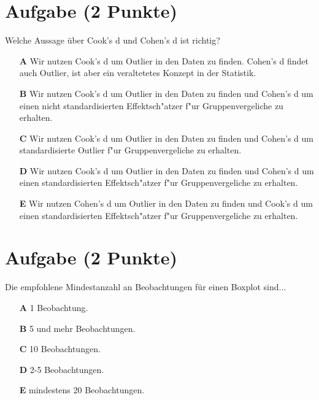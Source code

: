\documentclass[a4paper, 10pt]{scrartcl}\usepackage[]{graphicx}\usepackage[]{xcolor}
\begin{document}
\section{Aufgabe \hfill (2 Punkte)}

Welche Aussage {\"u}ber Cook's d und Cohen's d ist richtig? 



\begin{enumerate}
\item [\textbf{A} \msquare] Wir nutzen Cook's d um Outlier in den Daten zu finden. Cohen's d findet auch Outlier, ist aber ein veraltetetes Konzept in der Statistik.
\item [\textbf{B} \msquare] Wir nutzen Cook's d um Outlier in den Daten zu finden und Cohen's d um einen nicht standardisierten Effektsch{"a}tzer f{"u}r Gruppenvergeliche zu erhalten.
\item [\textbf{C} \msquare] Wir nutzen Cook's d um Outlier in den Daten zu finden und Cohen's d um standardisierte Outlier f{"u}r Gruppenvergeliche zu erhalten.
\item [\textbf{D} \msquare] Wir nutzen Cook's d um Outlier in den Daten zu finden und Cohen's d um einen standardisierten Effektsch{"a}tzer f{"u}r Gruppenvergeliche zu erhalten.
\item [\textbf{E} \msquare] Wir nutzen Cohen's d um Outlier in den Daten zu finden und Cook's d um einen standardisierten Effektsch{"a}tzer f{"u}r Gruppenvergeliche zu erhalten.
\end{enumerate} 

\section{Aufgabe \hfill (2 Punkte)}



Die empfohlene Mindestanzahl an Beobachtungen f{\"u}r einen Boxplot sind...



\begin{enumerate}
\item [\textbf{A} \msquare] 1 Beobachtung.
\item [\textbf{B} \msquare] 5 und mehr Beobachtungen.
\item [\textbf{C} \msquare] 10 Beobachtungen.
\item [\textbf{D} \msquare] 2-5 Beobachtungen.
\item [\textbf{E} \msquare] mindestens 20 Beobachtungen.
\end{enumerate} 
\end{document}
